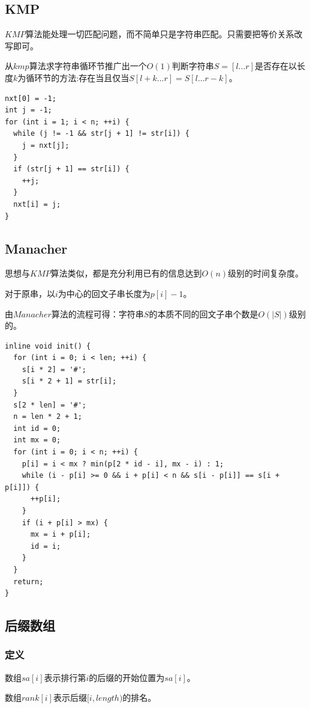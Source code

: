 \documentclass[11pt]{article}
\begin{document}
\subsection{KMP}
\label{sec:orgc0b77bf}

\(KMP\)算法能处理一切匹配问题，而不简单只是字符串匹配。只需要把等价关系改写即可。

从\(kmp\)算法求字符串循环节推广出一个\(O(1)\)判断字符串\(S=[l...r]\)是否存在以长度\(k\)为循环节的方法:存在当且仅当\(S[l+k...r]=S[l...r-k]\)。

\begin{verbatim}
nxt[0] = -1;
int j = -1;
for (int i = 1; i < n; ++i) {
  while (j != -1 && str[j + 1] != str[i]) {
    j = nxt[j];
  }
  if (str[j + 1] == str[i]) {
    ++j;
  }
  nxt[i] = j;
}
\end{verbatim}
\subsection{Manacher}
\label{sec:orgf22f2f0}

思想与\(KMP\)算法类似，都是充分利用已有的信息达到\(O(n)\)级别的时间复杂度。

对于原串，以\(i\)为中心的回文子串长度为\(p[i]-1\)。

由\(Manacher\)算法的流程可得：字符串\(S\)的本质不同的回文子串个数是\(O(|S|)\)级别的。

\begin{verbatim}
inline void init() {
  for (int i = 0; i < len; ++i) {
    s[i * 2] = '#';
    s[i * 2 + 1] = str[i];
  }
  s[2 * len] = '#';
  n = len * 2 + 1;
  int id = 0;
  int mx = 0;
  for (int i = 0; i < n; ++i) {
    p[i] = i < mx ? min(p[2 * id - i], mx - i) : 1;
    while (i - p[i] >= 0 && i + p[i] < n && s[i - p[i]] == s[i + p[i]]) {
      ++p[i];
    }
    if (i + p[i] > mx) {
      mx = i + p[i];
      id = i;
    }
  }
  return;
}
\end{verbatim}

\subsection{后缀数组}
\label{sec:orgefdd415}
\subsubsection{定义}
\label{sec:org830bee4}

数组\(sa[i]\)表示排行第\(i\)的后缀的开始位置为\(sa[i]\)。

数组\(rank[i]\)表示后缀\([i,length)\)的排名。
\end{document}

